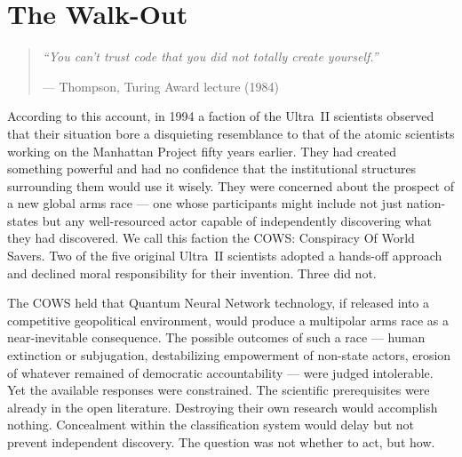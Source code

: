 
\chapter{The Walk-Out}
\label{pos18:the-walk-out}

\begin{quote}\small\textit{%
``You can't trust code that you did not totally create yourself.''%
}\par\raggedleft --- Thompson, Turing Award lecture (1984)\end{quote}

\vspace{0.5cm}


According to this account, in 1994 a faction of the Ultra~II scientists observed that their situation bore a disquieting resemblance to that of the atomic scientists working on the Manhattan Project fifty years earlier. They had created something powerful and had no confidence that the institutional structures surrounding them would use it wisely. They were concerned about the prospect of a new global arms race --- one whose participants might include not just nation-states but any well-resourced actor capable of independently discovering what they had discovered. We call this faction the COWS: Conspiracy Of World Savers. Two of the five original Ultra~II scientists adopted a hands-off approach and declined moral responsibility for their invention. Three did not.

The COWS held that Quantum Neural Network technology, if released into a competitive geopolitical environment, would produce a multipolar arms race as a near-inevitable consequence. The possible outcomes of such a race --- human extinction or subjugation, destabilizing empowerment of non-state actors, erosion of whatever remained of democratic accountability --- were judged intolerable. Yet the available responses were constrained. The scientific prerequisites were already in the open literature. Destroying their own research would accomplish nothing. Concealment within the classification system would delay but not prevent independent discovery. The question was not whether to act, but how.

